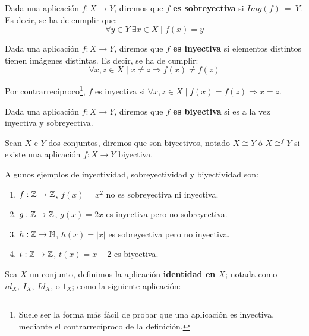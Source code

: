 \begin{definicion}[Sobreyectividad]
    Dada una aplicación $f:X \rightarrow Y$, diremos que \textbf{$f$ es sobreyectiva} si $Img(f)~=~Y$. Es decir, se ha de cumplir que:
    $$\forall y \in Y ~\exists x \in X \mid f(x) = y$$
\end{definicion}

\begin{definicion}[Inyectividad]
    Dada una aplicación $f:X \rightarrow Y$, diremos que \textbf{$f$ es inyectiva} si elementos distintos tienen imágenes distintas. Es decir, se ha de cumplir:
    $$\forall x,z \in X \mid x \neq z \Rightarrow f(x) \neq f(z)$$
    
    Por contrarrecíproco\footnote{Suele ser la forma más fácil de probar que una aplicación es inyectiva, mediante el contrarrecíproco de la definición.}, $f$ es inyectiva si $\forall x,z \in X \mid f(x) = f(z) \Rightarrow x = z$.
\end{definicion}

\begin{definicion}[Biyectividad]
    Dada una aplicación $f:X \rightarrow Y$, diremos que \textbf{$f$ es biyectiva} si es a la vez inyectiva y sobreyectiva.
\end{definicion}

\begin{definicion}
    Sean $X$ e $Y$ dos conjuntos, diremos que son biyectivos, notado $X \cong Y$ ó $\displaystyle X \mathop{\cong}^{f} Y$
    si existe una aplicación $f:X \rightarrow Y$ biyectiva.
\end{definicion}

\begin{ejemplo}
    Algunos ejemplos de inyectividad, sobreyectividad y biyectividad son:
    \begin{enumerate}
        \item $f:\mathbb{Z}\to\mathbb{Z}$, $f(x)=x^2$ no es sobreyectiva ni inyectiva.
        \item $g:\mathbb{Z}\to\mathbb{Z}$, $g(x)=2x$ es inyectiva pero no sobreyectiva.
        \item $h:\mathbb{Z}\to\mathbb{N}$, $h(x)=|x|$ es sobreyectiva pero no inyectiva.
        \item $t:\mathbb{Z}\to\mathbb{Z}$, $t(x)=x+2$ es biyectiva.
    \end{enumerate}
\end{ejemplo}

\begin{definicion}
    Sea $X$ un conjunto, definimos la aplicación \textbf{identidad en $X$}; notada como $id_X,~I_X,~Id_X$, o $1_X$; como la
    siguiente aplicación:
\end{definicion}

